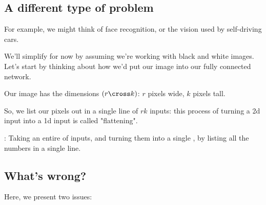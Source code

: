    \subsection{A different type of problem}
    
        For example, we might think of face recognition, or the vision used by self-driving cars.
        
        We'll simplify for now by assuming we're working with black and white images. Let's start by thinking about how we'd put our image into our fully connected network.
        
        Our image has the dimensions $(r \cross k)$: $r$ pixels wide, $k$ pixels tall.
        
        So, we list our pixels out in a single line of $rk$ inputs: this process of turning a 2d input into a 1d input is called "flattening".\\
        
        \begin{definition}
            : Taking an entire  of inputs, and turning them into a single , by listing all the numbers in a single line.
        \end{definition}
    
    \subsection{What's wrong?}
    
        Here, we present two issues:
        

